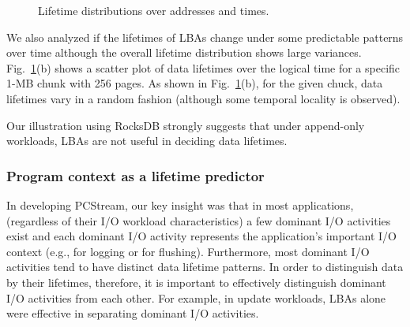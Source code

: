 \begin{figure}[t]
	\centering
	\hfill
	\hspace{10pt}
	\caption{Lifetime distributions over addresses and times.} %
	\label{fig:lba_lifetime}
\end{figure}


We also analyzed 
if the lifetimes of LBAs change under some predictable patterns over time 
although the overall lifetime distribution shows large variances.
Fig.~\ref{fig:lba_lifetime}(b) shows a scatter plot of data lifetimes over the logical time 
for a specific 1-MB chunk with 256 pages. 
As shown in Fig.~\ref{fig:lba_lifetime}(b), 
for the given chuck, data lifetimes vary in a random fashion
(although some temporal locality is observed).

Our illustration using RocksDB strongly suggests that under append-only
workloads, LBAs are not useful in deciding data lifetimes.

\subsubsection{Program context as a lifetime predictor}
In developing \textsf{\small PCStream}, our key insight was that in most applications,
(regardless of their I/O workload characteristics)
a few dominant I/O activities exist
and each dominant I/O activity   
represents the application's important I/O context (e.g., for logging or for flushing). 
Furthermore, most dominant I/O activities tend to have distinct data lifetime patterns.
In order to distinguish data by their lifetimes, therefore, 
it is important to effectively distinguish dominant I/O activities from each other.  
For example, in update workloads, 
LBAs alone were effective in separating dominant I/O activities.  


